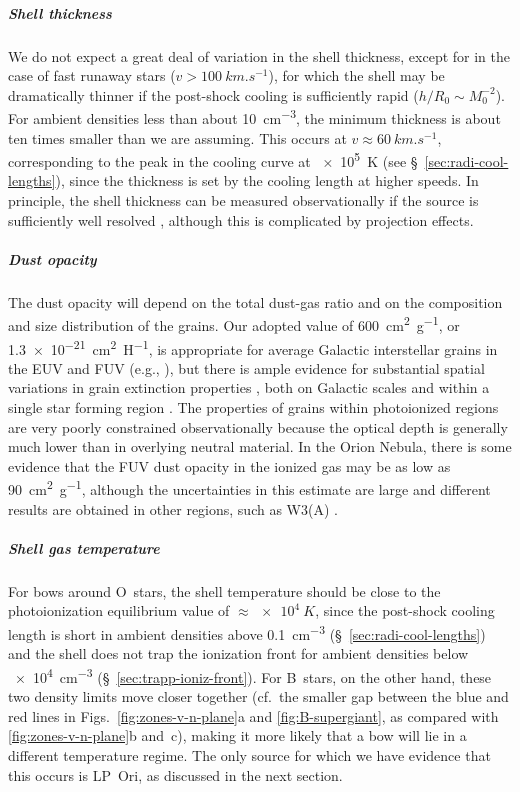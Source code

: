 \subparagraph{Shell thickness}
We do not expect a great deal of variation in the shell thickness,
except for in the case of fast runaway stars
(\(v > \SI{100}{km.s^{-1}}\)), for which the shell may be dramatically
thinner if the post-shock cooling is sufficiently rapid
(\(h / R_0 \sim M_0^{-2}\)).  For ambient densities less than about
\SI{10}{cm^{-3}}, the minimum thickness is about ten times smaller
than we are assuming.  This occurs at
\(v \approx \SI{60}{km.s^{-1}}\), corresponding to the peak in the
cooling curve at \SI{e5}{K} (see \S~\ref{sec:radi-cool-lengths}),
since the thickness is set by the cooling length at higher speeds.  In
principle, the shell thickness can be measured observationally if the
source is sufficiently well resolved \citep{Kobulnicky:2017a},
although this is complicated by projection effects.

\subparagraph{Dust opacity}
The dust opacity will depend on the total dust-gas ratio and on the
composition and size distribution of the grains.  Our adopted value of
\SI{600}{cm^2.g^{-1}}, or \SI{1.3e-21}{cm^2.H^{-1}}, is appropriate
for average Galactic interstellar grains in the EUV and FUV (e.g.,
\citealp{Weingartner:2001a}), but there is ample evidence for
substantial spatial variations in grain extinction properties
\citep{Fitzpatrick:2007a}, both on Galactic scales
\citep{Schlafly:2016a} and within a single star forming region
\citep{Beitia-Antero:2017a}.  The properties of grains within
photoionized regions are very poorly constrained observationally
because the optical depth is generally much lower than in overlying
neutral material.  In the Orion Nebula, there is some evidence
\citep{Salgado:2016a} that the FUV dust opacity in the ionized gas may
be as low as \SI{90}{cm^2.g^{-1}}, although the uncertainties in this
estimate are large and different results are obtained in other
regions, such as W3(A) \citep{Salgado:2012a}.   

\subparagraph{Shell gas temperature} For bows around O~stars, the
shell temperature should be close to the photoionization equilibrium
value of \(\approx \SI{e4}{K}\), since the post-shock cooling length
is short in ambient densities above \SI{0.1}{cm^{-3}}
(\S~\ref{sec:radi-cool-lengths}) and the shell does not trap the
ionization front for ambient densities below \SI{e4}{cm^{-3}}
(\S~\ref{sec:trapp-ioniz-front}).  For B~stars, on the other hand,
these two density limits move closer together (cf.~the smaller gap
between the blue and red lines in Figs.~\ref{fig:zones-v-n-plane}a and
\ref{fig:B-supergiant}, as compared with \ref{fig:zones-v-n-plane}b
and~c), making it more likely that a bow will lie in a different
temperature regime.  The only source for which we have evidence that
this occurs is LP~Ori, as discussed in the next section.



